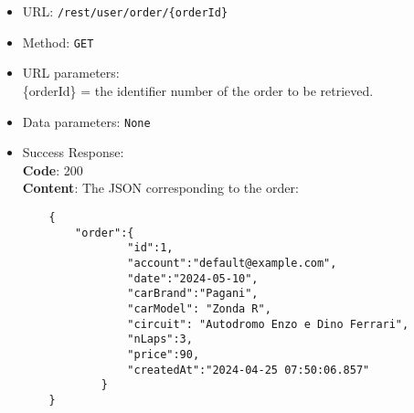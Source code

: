 \begin{itemize}
	\item URL: \texttt{/rest/user/order/\{orderId\}}
	\item Method: \texttt{GET}
	\item URL parameters:
		\\\{orderId\} = the identifier number of the order to be retrieved.
	\item Data parameters: \texttt{None}
	\item Success Response: \\
	\textbf{Code}: 200\\
	\textbf{Content}: The JSON corresponding to the order:
	\\\begin{verbatim}
	{
		"order":{
				"id":1,
				"account":"default@example.com",
				"date":"2024-05-10",
				"carBrand":"Pagani",
				"carModel": "Zonda R",
				"circuit": "Autodromo Enzo e Dino Ferrari",
				"nLaps":3,
				"price":90,
				"createdAt":"2024-04-25 07:50:06.857"
			}
	}
	\end{verbatim}


\end{itemize}
